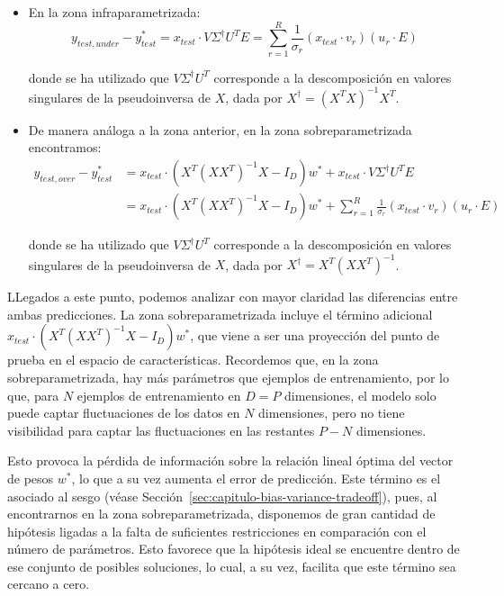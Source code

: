 \begin{itemize}
    \item En la zona infraparametrizada:
        \[
            y_{test, under} - y_{test}^{*} = x_{test} \cdot V \Sigma^{\dagger} U^{T} E = \sum_{r=1}^{R}\frac{1}{\sigma_r}(x_{test} \cdot v_r)(u_r \cdot E)
        \]

        donde se ha utilizado que $V \Sigma^{\dagger} U^{T}$ corresponde a la descomposición en valores singulares de la pseudoinversa de $X$, dada por $X^{\dagger} = {(X^T X)}^{-1} X^T$.

    \item De manera análoga a la zona anterior, en la zona sobreparametrizada encontramos: 
        \[
            \begin{aligned}
                y_{test, over} - y_{test}^{*} &= x_{test} \cdot (X^{T}{(XX^{T})}^{-1}X - I_{D}) w^{*} 
                + x_{test} \cdot V \Sigma^{\dagger} U^{T} E \\
                &= x_{test} \cdot (X^{T}{(XX^{T})}^{-1}X - I_{D}) w^{*} 
                + \sum_{r=1}^{R}\frac{1}{\sigma_r}(x_{test} \cdot v_r)(u_r \cdot E)
            \end{aligned}
        \]

        donde se ha utilizado que $V \Sigma^{\dagger} U^{T}$ corresponde a la descomposición en valores singulares de la pseudoinversa de $X$, dada por $X^{\dagger} = X^{T}{(XX^{T})}^{-1}$.\newline
\end{itemize}

LLegados a este punto, podemos analizar con mayor claridad las diferencias entre ambas predicciones. La zona sobreparametrizada incluye el término adicional $x_{test} \cdot (X^{T}{(XX^{T})}^{-1}X - I_{D}) w^{*}$, que viene a ser una proyección del punto de prueba en el espacio de características. Recordemos que, en la zona sobreparametrizada, hay más parámetros que ejemplos de entrenamiento, por lo que, para $N$ ejemplos de entrenamiento en $D = P$ dimensiones, el modelo solo puede captar fluctuaciones de los datos en $N$ dimensiones, pero no tiene visibilidad para captar las fluctuaciones en las restantes $P - N$ dimensiones.\newline

Esto provoca la pérdida de información sobre la relación lineal óptima del vector de pesos $w^{*}$, lo que a su vez aumenta el error de predicción. Este término es el asociado al sesgo (véase Sección~\ref{sec:capitulo-bias-variance-tradeoff}), pues, al encontrarnos en la zona sobreparametrizada, disponemos de gran cantidad de hipótesis ligadas a la falta de suficientes restricciones en comparación con el número de parámetros. Esto favorece que la hipótesis ideal se encuentre dentro de ese conjunto de posibles soluciones, lo cual, a su vez, facilita que este término sea cercano a cero.\newline

